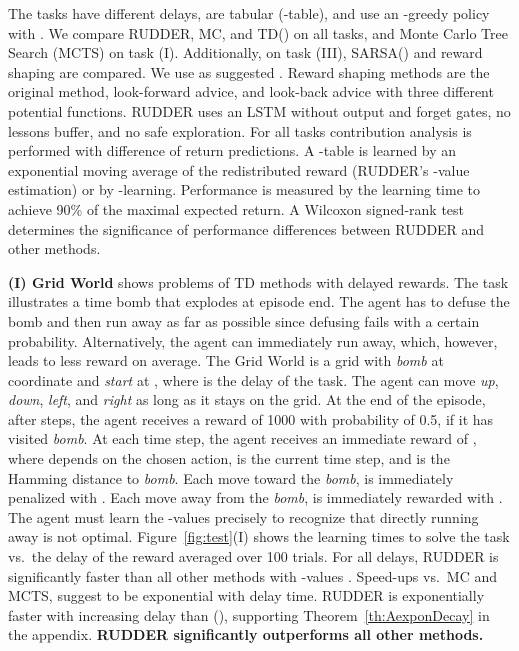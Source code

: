 \documentclass{article}
\begin{document}
The tasks have different delays, 
are tabular (-table),
and use an -greedy policy with .
We compare RUDDER, MC, and TD() 
on all tasks, and Monte Carlo Tree Search (MCTS) on task (I).
Additionally, on task (III), SARSA() and reward shaping are compared.
We use  as suggested \cite{Sutton:18book}.
Reward shaping methods are the original method, look-forward advice,
and look-back advice with three different potential functions.
RUDDER uses an LSTM without output and forget gates,
no lessons buffer, and no safe exploration. 
For all tasks contribution analysis is performed 
with difference of return predictions.  
A -table is learned 
by an exponential moving average of 
the redistributed reward (RUDDER's -value estimation) 
or by -learning. 
Performance is measured by 
the learning time to achieve 90\% of the maximal expected return.
A Wilcoxon signed-rank test determines 
the significance of performance differences between RUDDER
and other methods.



{\bf(I) Grid World} 
shows problems of TD methods with delayed rewards.
The task illustrates a time bomb that
explodes at episode end.
The agent has to defuse the bomb
and then run away as far as possible since
defusing fails with a certain probability.
Alternatively, the agent can immediately run away, 
which, however, leads to less reward on average.
The Grid World is a  grid with
{\em bomb} at coordinate  and
{\em start} at , where  is the delay of the task.
The agent can move 
{\em up}, {\em down}, {\em left}, and {\em right} as long as
it stays on the grid.
At the end of the episode, after  steps, 
the agent receives a reward of 1000
with probability of 0.5, 
if it has visited {\em bomb}.
At each time step, the agent receives 
an immediate reward of , 
where  depends on the chosen action, 
 is the current time step, and  is 
the Hamming distance to {\em bomb}.
Each move toward the {\em bomb}, 
is immediately penalized with . 
Each move away from the {\em bomb}, 
is immediately rewarded with . 
The agent must learn the -values precisely to
recognize that directly running away is not optimal.
Figure~\ref{fig:test}(I) shows the 
learning times 
to solve the task vs.\ the delay of the reward averaged over 100 trials.
For all delays, RUDDER is significantly faster than all other methods
with -values .
Speed-ups vs.\ MC and MCTS,
suggest to be exponential with delay time.
RUDDER is exponentially faster with increasing 
delay than (), 
supporting Theorem~\ref{th:AexponDecay} in the appendix. 
{\bf RUDDER significantly outperforms all other methods.}
\end{document}
